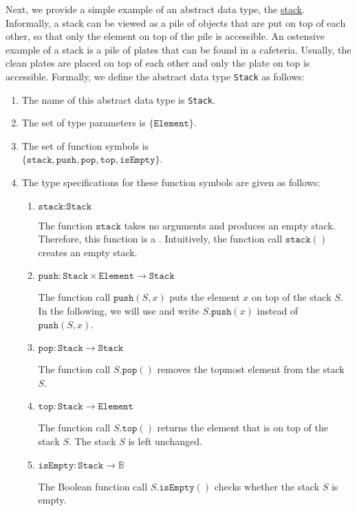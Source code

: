 Next, we provide a simple example of an abstract data type, the 
\href{https://en.wikipedia.org/wiki/Stack_(abstract_data_type)}{stack}.
Informally, a stack can be viewed as a pile of objects that are put on top of each other, so that
only the element on top of the pile is accessible.  An ostensive example of a stack is a pile of
plates that can be found in a cafeteria.  Usually, the clean plates are placed on top of each other
and only the plate on top is accessible.  Formally, we define the abstract data type
\texttt{Stack} as follows: 
\begin{enumerate}
\item The name of this abstract data type is \texttt{Stack}.
\item The set of type parameters is $\{ \texttt{Element} \}$.
\item The set of function symbols is \\[0.2cm]
      \hspace*{1.3cm} 
      $\bigl\{ \texttt{stack}, \texttt{push}, \texttt{pop}, \texttt{top}, \texttt{isEmpty} \bigr\}$.
\item The type specifications for these function symbols are given as follows:
      \begin{enumerate}
      \item $\texttt{stack}: \texttt{Stack}$

            The function $\texttt{stack}$ takes no arguments and produces an empty stack.
            Therefore, this function is a .  Intuitively, the function call $\texttt{stack}()$ 
            creates an empty stack.
      \item $\texttt{push}: \texttt{Stack} \times \texttt{Element} \rightarrow \texttt{Stack}$

            The function call $\texttt{push}(S,x)$ puts the element $x$ on top of the stack $S$.  In
            the following, we will use 
            and write $S.\texttt{push}(x)$ instead of $\texttt{push}(S,x)$.
      \item $\texttt{pop}: \texttt{Stack}  \rightarrow \texttt{Stack}$

            The function call $S.\texttt{pop}()$ removes the topmost element from the stack $S$.
      \item $\texttt{top}: \texttt{Stack} \rightarrow \texttt{Element}$

            The function call $S.\texttt{top}()$ returns the element that is on top of the stack $S$. 
            The stack $S$ is left unchanged.
     \item $\texttt{isEmpty}: \texttt{Stack} \rightarrow \mathbb{B}$

            The Boolean function call $S.\texttt{isEmpty}()$ checks whether the stack $S$ is empty.
      \end{enumerate}
\end{enumerate}
